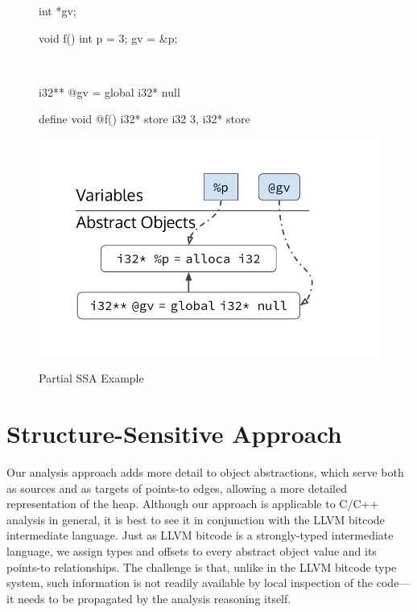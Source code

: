 \begin{figure}
  \begin{minipage}[b]{.18\linewidth}
\begin{cppcode}
int *gv;

void f()
{
  int p = 3;
  gv = &p;
}
\end{cppcode}
    \label{structsens/fig/partialssa:c}
  \end{minipage}
  ~
  \begin{minipage}[b]{.4\linewidth}
\begin{bitcode}
i32** @gv = global i32* null

define void @f() {
  i32* %
  store i32 3, i32* %
  store %
}
\end{bitcode}
    \label{structsens/fig/partialssa:llvm}
  \end{minipage}
  \begin{minipage}[b]{.33\linewidth}
    \centering
    \includegraphics[trim={14mm 10mm 0 0},clip,width=1.5\linewidth]{figures/structsens/Partial-SSA.pdf}
    \label{structsens/fig/partialssa:pt}
  \end{minipage}
  \caption{Partial SSA Example}
  \label{structsens/fig/partialssa}
\end{figure}


\section{Structure-Sensitive Approach}
\label{structsens/sect/approach}

Our analysis approach adds more detail to object abstractions, which
serve both as sources and as targets of points-to edges, allowing a
more detailed representation of the heap. Although our approach is
applicable to C/C++ analysis in general, it is best to see it in
conjunction with the LLVM bitcode intermediate language. Just as LLVM
bitcode is a strongly-typed intermediate language, we assign types and
offsets to every abstract object value and its points-to
relationships. The challenge is that, unlike in the LLVM bitcode type
system, such information is not readily available by local inspection
of the code---it needs to be propagated by the analysis reasoning
itself.

